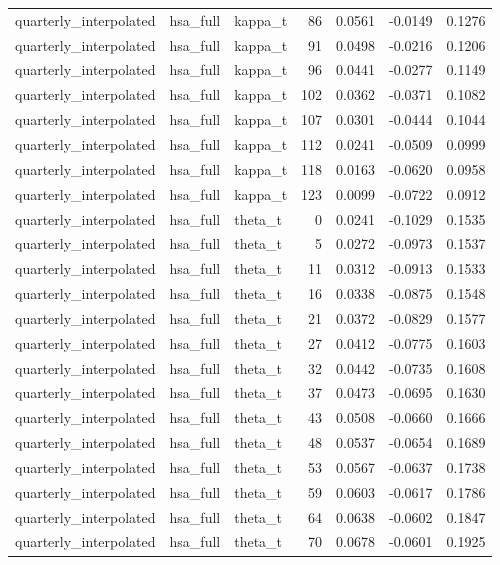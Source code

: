 \begin{tabular}{lllrrrr}
quarterly\_interpolated & hsa\_full & kappa\_t & 86 & 0.0561 & -0.0149 & 0.1276 \\
quarterly\_interpolated & hsa\_full & kappa\_t & 91 & 0.0498 & -0.0216 & 0.1206 \\
quarterly\_interpolated & hsa\_full & kappa\_t & 96 & 0.0441 & -0.0277 & 0.1149 \\
quarterly\_interpolated & hsa\_full & kappa\_t & 102 & 0.0362 & -0.0371 & 0.1082 \\
quarterly\_interpolated & hsa\_full & kappa\_t & 107 & 0.0301 & -0.0444 & 0.1044 \\
quarterly\_interpolated & hsa\_full & kappa\_t & 112 & 0.0241 & -0.0509 & 0.0999 \\
quarterly\_interpolated & hsa\_full & kappa\_t & 118 & 0.0163 & -0.0620 & 0.0958 \\
quarterly\_interpolated & hsa\_full & kappa\_t & 123 & 0.0099 & -0.0722 & 0.0912 \\
quarterly\_interpolated & hsa\_full & theta\_t & 0 & 0.0241 & -0.1029 & 0.1535 \\
quarterly\_interpolated & hsa\_full & theta\_t & 5 & 0.0272 & -0.0973 & 0.1537 \\
quarterly\_interpolated & hsa\_full & theta\_t & 11 & 0.0312 & -0.0913 & 0.1533 \\
quarterly\_interpolated & hsa\_full & theta\_t & 16 & 0.0338 & -0.0875 & 0.1548 \\
quarterly\_interpolated & hsa\_full & theta\_t & 21 & 0.0372 & -0.0829 & 0.1577 \\
quarterly\_interpolated & hsa\_full & theta\_t & 27 & 0.0412 & -0.0775 & 0.1603 \\
quarterly\_interpolated & hsa\_full & theta\_t & 32 & 0.0442 & -0.0735 & 0.1608 \\
quarterly\_interpolated & hsa\_full & theta\_t & 37 & 0.0473 & -0.0695 & 0.1630 \\
quarterly\_interpolated & hsa\_full & theta\_t & 43 & 0.0508 & -0.0660 & 0.1666 \\
quarterly\_interpolated & hsa\_full & theta\_t & 48 & 0.0537 & -0.0654 & 0.1689 \\
quarterly\_interpolated & hsa\_full & theta\_t & 53 & 0.0567 & -0.0637 & 0.1738 \\
quarterly\_interpolated & hsa\_full & theta\_t & 59 & 0.0603 & -0.0617 & 0.1786 \\
quarterly\_interpolated & hsa\_full & theta\_t & 64 & 0.0638 & -0.0602 & 0.1847 \\
quarterly\_interpolated & hsa\_full & theta\_t & 70 & 0.0678 & -0.0601 & 0.1925 \\

\end{tabular}
